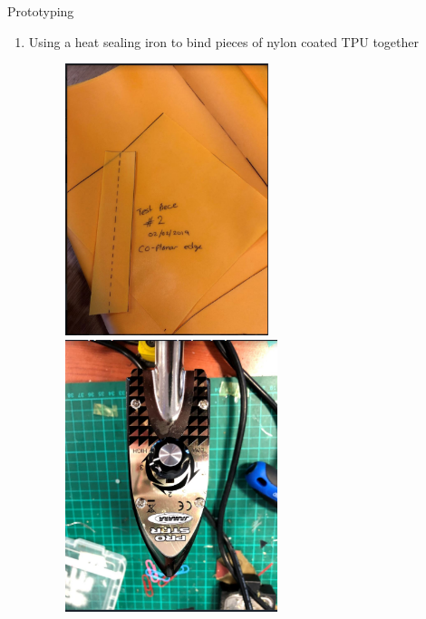 \documentclass[final]{beamer}
\newlength{\sepwid}
\newlength{\onecolwid}
\newlength{\twocolwid}
\begin{document}
\begin{frame}
\begin{columns}[t]
\begin{column}{\twocolwid}
\begin{columns}[t,totalwidth=\twocolwid]
\begin{column}{\onecolwid}
\end{column} %
\begin{column}{\sepwid}\end{column} %

\begin{column}{\onecolwid}\vspace{-.74in} %

\begin{block}{Prototyping}

\begin{enumerate}
\item Using a heat sealing iron to bind pieces of nylon coated TPU together
\begin{figure}
\includegraphics[height=300, width=0.5\linewidth]{img/Proto1.PNG}
\includegraphics[height=300, width=0.5\linewidth]{img/Proto2.PNG}

\end{figure}
\end{enumerate}
\end{block}
\end{column}
\end{columns}
\end{column}
\end{columns}
\end{frame}
\end{document}
